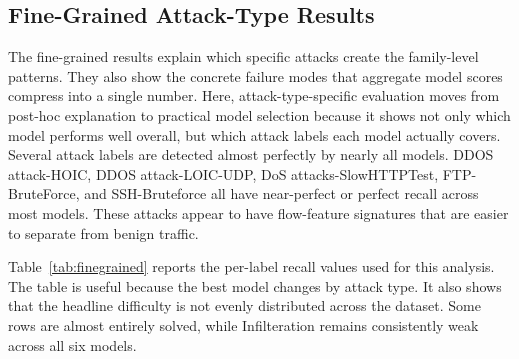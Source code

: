 \documentclass[sigconf,nonacm]{acmart}
\begin{document}
\subsection{Fine-Grained Attack-Type Results}

The fine-grained results explain which specific attacks create the family-level patterns.
They also show the concrete failure modes that aggregate model scores compress into a single number.
Here, attack-type-specific evaluation moves from post-hoc explanation to practical model selection because it shows not only which model performs well overall, but which attack labels each model actually covers.
Several attack labels are detected almost perfectly by nearly all models.
DDOS attack-HOIC, DDOS attack-LOIC-UDP, DoS attacks-SlowHTTPTest, FTP-BruteForce, and SSH-Bruteforce all have near-perfect or perfect recall across most models.
These attacks appear to have flow-feature signatures that are easier to separate from benign traffic.

Table~\ref{tab:finegrained} reports the per-label recall values used for this analysis.
The table is useful because the best model changes by attack type.
It also shows that the headline difficulty is not evenly distributed across the dataset.
Some rows are almost entirely solved, while Infilteration remains consistently weak across all six models.
\end{document}
